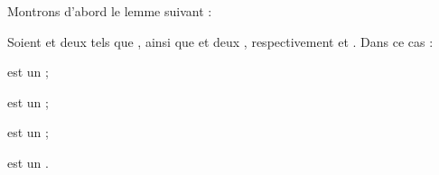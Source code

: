 \documentclass[a4paper,french,bookmarks]{book}
\begin{document}
    Montrons d'abord le lemme suivant :
    \begin{lemma}{}{}
        Soient  et  deux  tels que \hg{$\Sigma_1 \cap \Sigma_2 \neq \emptyset$}, ainsi que  et  deux , respectivement  et . Dans ce cas :
        \begin{enumerate}
            \itast {} est un  ;

            \itast {} est un  ;
            
            \itast {} est un  ;
            
            \itast {} est un .
        \end{enumerate}
    \end{lemma}
    
\end{document}
